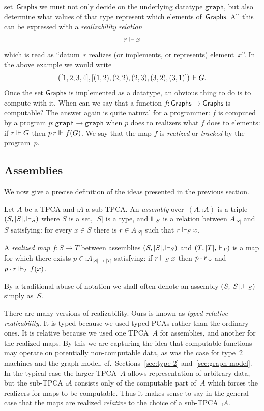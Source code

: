 set~$\mathsf{Graphs}$ we must not only decide on the underlying
datatype $\mathtt{graph}$, but also determine what values of that type
represent which elements of~$\mathsf{Graphs}$. All this can be
expressed with a \emph{realizability relation}
%
\begin{equation*}
  r \Vdash x
\end{equation*}
%
which is read as ``datum~$r$ realizes (or implements, or represents)
element~$x$''. In the above example we would write
%
\begin{equation*}
([1, 2, 3, 4], [(1,2), (2,2), (2,3), (3,2), (3,1)]) \Vdash G.
\end{equation*}
%
Once the set $\mathsf{Graphs}$ is implemented as a datatype, an
obvious thing to do is to compute with it. When can we say that a
function $f : \mathsf{Graphs} \to \mathsf{Graphs}$ is computable? The
answer again is quite natural for a programmer: $f$ is computed by a
program $p : \mathtt{graph} \to \mathtt{graph}$ when $p$ does to
realizers what $f$ does to elements: if $r \Vdash G$ then $p \, r \Vdash
f(G)$. We say that the map $f$ is \emph{realized} or \emph{tracked} by
the program~$p$.


\subsection{Assemblies}
\label{sec:assemblies}

We now give a precise definition of the ideas presented in the
previous section.

\begin{definition}[Assemblies]
  Let $A$ be a TPCA and $\comp{A}$ a sub-TPCA. An \emph{assembly}
  over~$(A, \comp{A})$ is a triple $(S, |S|, {\Vdash_S})$ where $S$ is a
  set, $|S|$ is a type, and $\Vdash_S$ is a relation between $A_{|S|}$
  and~$S$ satisfying: for every $x \in S$ there is $r \in A_{|S|}$
  such that $r \Vdash_S x$.

  A \emph{realized map} $f : S \to T$ between assemblies $(S, |S|,
  {\Vdash_S})$ and $(T, |T|, {\Vdash_T})$ is a map for which there exists $p
  \in \comp{A}_{|S| \to |T|}$ satisfying: if $r \Vdash_S x$ then $p
    \cdot r\,{\downarrow}$ and $p \cdot r \Vdash_T f(x)$.
\end{definition}

\noindent
By a traditional abuse of notation we shall often denote an assembly
$(S, |S|, {\Vdash_S})$ simply as~$S$.

There are many versions of realizability. Ours is known as \emph{typed
  relative realizability}. It is typed because we used typed PCAs
rather than the ordinary ones. It is relative because we used one
TPCA~$A$ for assemblies, and another for the realized maps. By this we
are capturing the idea that computable functions may operate on
potentially non-computable data, as was the case for type~2 machines
and the graph model, cf.\ Sections~\ref{sec:type-2}
and~\ref{sec:graph-model}. In the typical case the larger TPCA~$A$
allows representation of arbitrary data, but the sub-TPCA $\comp{A}$
consists only of the computable part of~$A$ which forces the realizers
for maps to be computable. Thus it makes sense to say in the general
case that the maps are realized \emph{relative} to the choice of a
sub-TPCA~$\comp{A}$.

